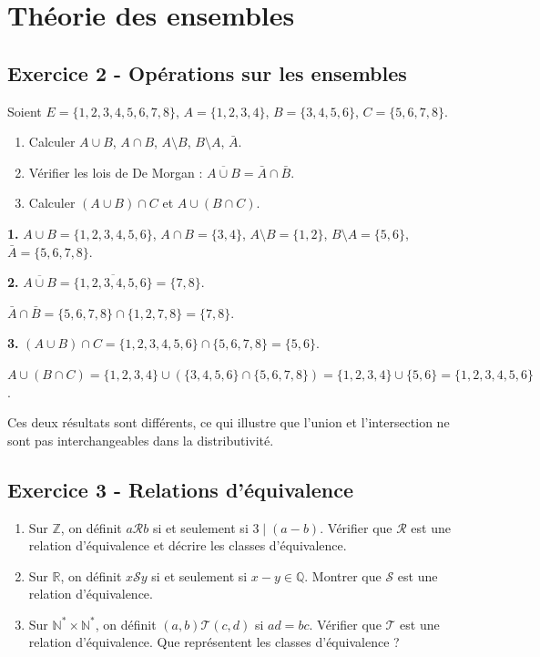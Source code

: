 \documentclass[12pt,a4paper]{article}
\begin{document}
\section{Théorie des ensembles}

\subsection*{Exercice 2 - Opérations sur les ensembles \niveau{\facile}}

\begin{boiteexercice}
Soient $E=\{1,2,3,4,5,6,7,8\}$, $A=\{1,2,3,4\}$, $B=\{3,4,5,6\}$, $C=\{5,6,7,8\}$.
\begin{enumerate}
  \item Calculer $A\cup B$, $A\cap B$, $A\setminus B$, $B\setminus A$, $\bar{A}$.
  \item Vérifier les lois de De Morgan : $\overline{A\cup B}=\bar{A}\cap\bar{B}$.
  \item Calculer $(A\cup B)\cap C$ et $A\cup(B\cap C)$.
\end{enumerate}
\end{boiteexercice}

\begin{boitecorrige}
\textbf{1.}
$A\cup B = \{1,2,3,4,5,6\}$, $A\cap B = \{3,4\}$, $A\setminus B=\{1,2\}$, $B\setminus A=\{5,6\}$, $\bar{A}=\{5,6,7,8\}$.

\textbf{2.} $\overline{A\cup B}=\overline{\{1,2,3,4,5,6\}}=\{7,8\}$.

$\bar{A}\cap\bar{B} = \{5,6,7,8\}\cap\{1,2,7,8\} = \{7,8\}$.

\textbf{3.} $(A\cup B)\cap C = \{1,2,3,4,5,6\}\cap\{5,6,7,8\} = \{5,6\}$.

$A\cup(B\cap C) = \{1,2,3,4\}\cup(\{3,4,5,6\}\cap\{5,6,7,8\}) = \{1,2,3,4\}\cup\{5,6\} = \{1,2,3,4,5,6\}$.

Ces deux résultats sont différents, ce qui illustre que l'union et l'intersection ne sont pas interchangeables dans la distributivité.
\end{boitecorrige}

\subsection*{Exercice 3 - Relations d'équivalence \niveau{\moyen}}

\begin{boiteexercice}
\begin{enumerate}
  \item Sur $\mathbb{Z}$, on définit $a\mathcal{R}b$ si et seulement si $3\mid(a-b)$. Vérifier que $\mathcal{R}$ est une relation d'équivalence et décrire les classes d'équivalence.
  \item Sur $\mathbb{R}$, on définit $x\mathcal{S}y$ si et seulement si $x-y\in\mathbb{Q}$. Montrer que $\mathcal{S}$ est une relation d'équivalence.
  \item Sur $\mathbb{N}^*\times\mathbb{N}^*$, on définit $(a,b)\mathcal{T}(c,d)$ si $ad=bc$. Vérifier que $\mathcal{T}$ est une relation d'équivalence. Que représentent les classes d'équivalence ?
\end{enumerate}
\end{boiteexercice}
\end{document}
